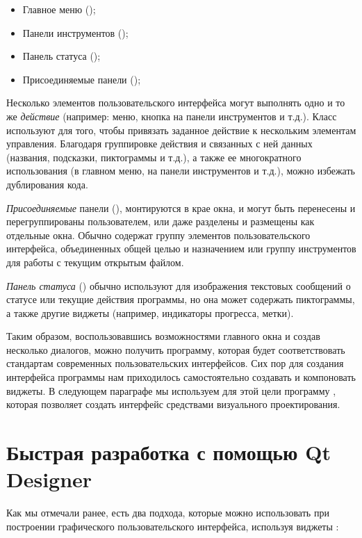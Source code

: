 \begin{itemize}
\item Главное меню ();
\item Панели инструментов ();
\item Панель статуса ();
\item Присоединяемые панели ();
\end{itemize}
Несколько элементов пользовательского интерфейса могут выполнять одно и то же \emph{действие} (например: меню,
кнопка на панели инструментов и т.д.). Класс  используют для того, чтобы
привязать заданное действие к нескольким элементам управления. Благодаря группировке действия и связанных с ней данных
(названия, подсказки, пиктограммы и т.д.), а также ее многократного использования (в главном меню, на панели
инструментов и т.д.), можно избежать дублирования кода.

\emph{Присоединяемые} панели 
(), монтируются в крае окна, и могут быть перенесены и перегруппированы
пользователем, или даже разделены и размещены как отдельные окна. Обычно содержат группу элементов пользовательского
интерфейса, объединенных общей целью и назначением или группу инструментов для работы с текущим открытым файлом.

\emph{Панель статуса} 
() обычно используют для изображения текстовых сообщений о статусе или текущие
действия программы, но она может содержать пиктограммы, а также другие виджеты (например, индикаторы прогресса, метки).

Таким образом, воспользовавшись возможностями главного окна и создав несколько диалогов, можно получить программу,
которая будет соответствовать стандартам современных пользовательских интерфейсов. Сих пор для создания интерфейса
программы нам приходилось самостоятельно создавать и компоновать виджеты. В следующем параграфе мы используем для этой
цели программу , которая позволяет создать интерфейс средствами визуального проектирования.

\section[Быстрая разработка с помощью Qt Designer]{Быстрая разработка с помощью Qt Designer}
Как мы отмечали ранее, есть два подхода, которые можно использовать при построении графического пользовательского
интерфейса, используя виджеты :

